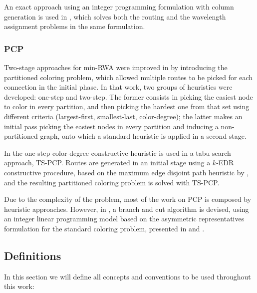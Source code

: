 An exact approach using an integer programming formulation with column generation is used in \cite{lee2002optimization}, which solves both the routing and the wavelength assignment problems in the same formulation.

\subsubsection*{PCP}

Two-stage approaches for min-RWA were improved in \cite{Li00thepartition} by introducing the partitioned coloring problem, which allowed multiple routes to be picked for each connection in the initial phase. In that work, two groups of heuristics were developed: one-step and two-step. The former consists in picking the easiest node to color in every partition, and then picking the hardest one from that set using different criteria (largest-first, smallest-last, color-degree); the latter makes an initial pass picking the easiest nodes in every partition and inducing a non-partitioned graph, onto which a standard heuristic is applied in a second stage.

In \cite{noronha2006routing} the one-step color-degree constructive heuristic is used in a tabu search approach, TS-PCP. Routes are generated in an initial stage using a $k$-EDR constructive procedure, based on the maximum edge disjoint path heuristic by \cite{kleinberg1996approximation}, and the resulting partitioned coloring problem is solved with TS-PCP.

Due to the complexity of the problem, most of the work on PCP is composed by heuristic approaches. However, in \cite{frota2010branch}, a branch and cut algorithm is devised, using an integer linear programming model based on the asymmetric representatives formulation for the standard coloring problem, presented in \cite{campelo2004cliques} and \cite{campelo2008asymmetric}.

\subsection{Definitions}
\label{subsec:intro:definitions}

In this section we will define all concepts and conventions to be used throughout this work: 

